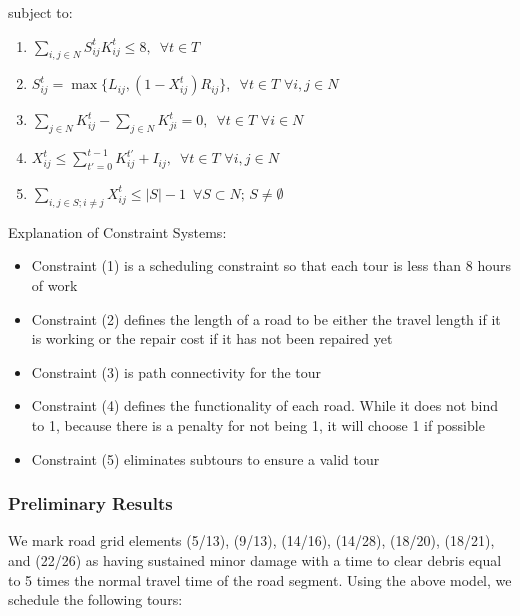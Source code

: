 \documentclass{article}
\begin{document}
	subject to:
	\begin{enumerate}[label=(\arabic*), leftmargin=*, itemsep=0.4ex, before={\everymath{\displaystyle}}]%
		\item $\sum_{i,j \in N} S_{ij}^t K_{ij}^t \leq 8, \hspace{6pt} \forall t\in T$
		\item $S_{ij}^t = \max \{L_{ij}, (1-X_{ij}^t)R_{ij} \}, \hspace{6pt} \forall t\in T \hspace{4pt} \forall i,j \in N$
		\item $\sum_{j \in N} K_{ij}^t - \sum_{j \in N} K_{ji}^t = 0, \hspace{6pt} \forall t\in T \hspace{4pt} \forall i \in N$
		\item $X_{ij}^t \le \sum_{t'=0}^{t-1} K_{ij}^{t'} + I_{ij}, \hspace{6pt} \forall t\in T \hspace{4pt} \forall i,j \in N$
		\item $\sum_{i,j \in S; i\neq j} X_{ij}^t \leq |S|-1 \hspace{6pt} \forall S \subset N; \hspace{2pt} S \neq \emptyset$
	\end{enumerate}
	
Explanation of Constraint Systems:
	\begin{itemize}
		\item Constraint (1) is a scheduling constraint so that each tour is less than 8 hours of work
		\item Constraint (2) defines the length of a road to be either the travel length if it is working or the repair cost if it has not been repaired yet
		\item Constraint (3) is path connectivity for the tour
		\item Constraint (4) defines the functionality of each road. While it does not bind to 1, because there is a penalty for not being 1, it will choose 1 if possible
		\item Constraint (5) eliminates subtours to ensure a valid tour
	\end{itemize}

\subsubsection{Preliminary Results}

We mark road grid elements (5/13), (9/13), (14/16), (14/28), (18/20), (18/21), and (22/26) as having sustained minor damage with a time to clear debris equal to 5 times the normal travel time of the road segment. Using the above model, we schedule the following tours:
\end{document}
